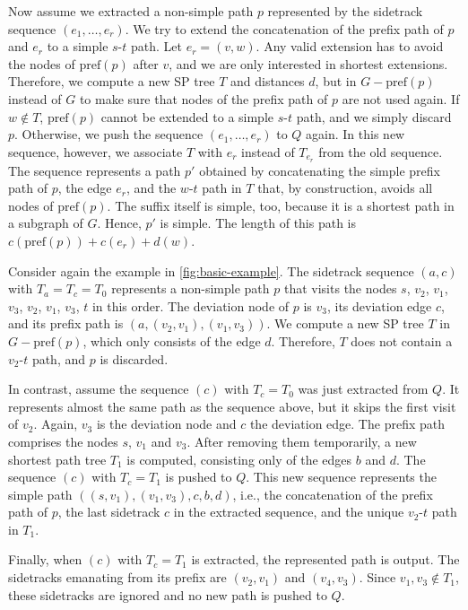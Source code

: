 \documentclass[runningheads,a4paper]{llncs}
\newcommand{\dist}{d}
\newcommand{\pref}{\text{pref}}
\begin{document}
Now assume we extracted a non-simple path $p$ represented by the sidetrack sequence $(e_1, \ldots, e_r)$.
We try to extend the concatenation of the prefix path of $p$ and $e_r$ to a simple $s$-$t$ path.
Let $e_r = (v, w)$.
Any valid extension has to avoid the nodes of $\pref(p)$ after $v$, and we are only interested in shortest extensions.
Therefore, we compute a new SP tree $T$ and distances $\dist$, but in $G - \pref(p)$ instead of $G$ to make sure that nodes of the prefix path of $p$ are not used again.
If $w \notin T$, $\pref(p)$ cannot be extended to a simple $s$-$t$ path, and we simply discard $p$.
Otherwise, we push the sequence $(e_1, \ldots, e_r)$ to $Q$ again.
In this new sequence, however, we associate $T$ with $e_r$ instead of $T_{e_r}$ from the old sequence.
The sequence represents a path $p'$ obtained by concatenating the simple prefix path of $p$, the edge $e_r$, and the $w$-$t$ path in $T$ that, by construction, avoids all nodes of $\pref(p)$.
The suffix itself is simple, too, because it is a shortest path in a subgraph of $G$.
Hence, $p'$ is simple.
The length of this path is $c(\pref(p)) + c(e_r) + \dist(w)$.

Consider again the example in \autoref{fig:basic-example}.
The sidetrack sequence $(a, c)$ with $T_a = T_c = T_0$ represents a non-simple path $p$ that visits the nodes $s$, $v_2$, $v_1$, $v_3$, $v_2$, $v_1$, $v_3$, $t$ in this order.
The deviation node of $p$ is $v_3$, its deviation edge $c$, and its prefix path is $(a, (v_2, v_1), (v_1, v_3))$.
We compute a new SP tree $T$ in $G - \pref(p)$, which only consists of the edge $d$.
Therefore, $T$ does not contain a $v_2$-$t$ path, and $p$ is discarded.

In contrast, assume the sequence $(c)$ with $T_c = T_0$ was just extracted from $Q$.
It represents almost the same path as the sequence above, but it skips the first visit of $v_2$.
Again, $v_3$ is the deviation node and $c$ the deviation edge.
The prefix path comprises the nodes $s$, $v_1$ and $v_3$.
After removing them temporarily, a new shortest path tree $T_1$ is computed, consisting only of the edges $b$ and $d$.
The sequence $(c)$ with $T_c = T_1$ is pushed to $Q$.
This new sequence represents the simple path $((s, v_1), (v_1, v_3), c, b, d)$, i.e., the concatenation of the prefix path of $p$, the last sidetrack $c$ in the extracted sequence, and the unique $v_2$-$t$ path in $T_1$.

Finally, when $(c)$ with $T_c = T_1$ is extracted, the represented path is output.
The sidetracks emanating from its prefix are $(v_2, v_1)$ and $(v_4, v_3)$.
Since $v_1, v_3 \notin T_1$, these sidetracks are ignored and no new path is pushed to $Q$.
\end{document}
